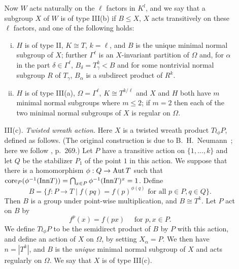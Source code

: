 \begin{enumerate}
\begin{enumerate}
Now $W$ acts naturally on the $\ell$ factors in $K^l$, and we say that a subgroup $X$ of $W$
is of type III(b) if $B\leq X$, $X$ acts transitively on these $\ell$ factors, and one of the
following holds:
\begin{enumerate}[(i)]
\item 
$H$ is of type II, $K\cong T$, $k = \ell$, and $B$ is the unique minimal normal subgroup
of $X$; further $\Gamma^\ell$ is an $X$-invariant partition of $\Omega$ and, for
$\alpha$ in the part $\delta \in \Gamma^\ell$,
$B_\delta = T_\gamma^k < B$ and for some nontrivial normal subgroup $R$ of
$T_\gamma$, $B_\alpha$ is a
subdirect product of $R^k$.
\item 
$H$ is of type III(a), $\Omega = \Gamma^\ell$, $K\cong T^{k/\ell}$ and $X$ and $H$ both have $m$ minimal
normal subgroups where $m \leq 2$; if $m = 2$ then each of the two minimal
normal subgroups of $X$ is regular on $\Omega$.
\end{enumerate}
\item[III(c).] \emph{Twisted wreath action.} Here $X$ is a twisted wreath
  product $T \wr_\phi P$, defined
as follows. (The original construction is due to B.~H.~Neumann~\cite{Neumann:1963}; 
here we follow \cite{Suzuki:1982}, p.~269.) 
Let $P$ have a transitive action on $\{1,...,k\}$ and let $Q$ be the stabilizer $P_1$ of
the point $1$ in this action. We suppose that there is a homomorphism $\phi : Q \rightarrow \operatorname{Aut} T$
such that $\mathrm{core}_P (\phi^{-1}(\mathrm{Inn} T)) = \bigcap_{x\in P} \phi^{-1}(\mathrm{Inn} T)^x = 1$. Define
\[
B = \{f:P\rightarrow T \mid f(pq) =f(p)^{\phi(q)} \text{ for all }
p\in P, q\in Q\}.
\]
Then $B$ is a group under point-wise multiplication, and $B \cong T^k$. Let $P$
act on $B$ by
\[
f^p(x)=f(px) \quad \text{ for $p,x \in P$.}
\]
We define $T \wr_\phi P$ to be the semidirect product of $B$ by $P$ with this action, and define
an action of $X$ on $\Omega$, by setting $X_\alpha = P$. We then have $n = |T^k|$, and $B$ is the \emph{unique}
minimal normal subgroup of $X$ and acts regularly on $\Omega$. We say that $X$ is of type
III(c).
\end{enumerate}
\end{enumerate}
